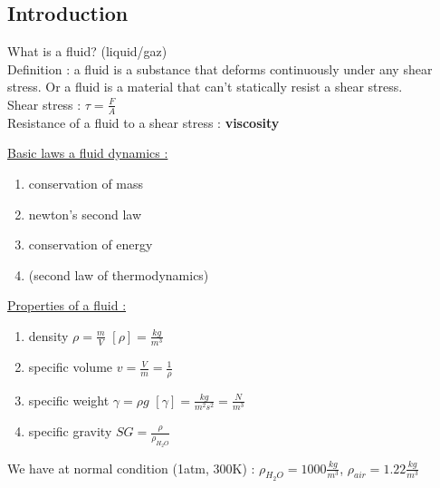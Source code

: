 \documentclass[../main.tex]{subfiles}
\begin{document}
\localtableofcontents
\subsection{Introduction}
\quad What is a fluid? (liquid/gaz)\\

Definition : a fluid is a substance that deforms continuously under any shear stress. Or a fluid is a material that can't statically resist a shear stress.\\

Shear stress : $\tau = \frac{F}{A}$\\
Resistance of a fluid to a shear stress : \textbf{viscosity}\\

\begin{minipage}{.5\textwidth}
\quad \underline{Basic laws a fluid dynamics :}\\
\begin{enumerate}
    \item conservation of mass\\
    \item newton's second law\\
    \item conservation of energy\\
    \item (second law of thermodynamics)\\
\end{enumerate}
\end{minipage}
\hfill
\begin{minipage}{.5\textwidth}
    \quad \underline{Properties of a fluid :}\\
\begin{enumerate}
    \item density $\rho = \frac{m}{V}$ $[\rho] = \frac{kg}{m^3}$\\
    \item specific volume $v = \frac{V}{m} = \frac{1}{\rho}$\\
    \item specific weight $\gamma = \rho g$ $[\gamma] = \frac{kg}{m^2s^2} = \frac{N}{m^3}$\\
    \item specific gravity $SG = \frac{\rho}{\rho_{H_2O}}$\\
\end{enumerate}
\end{minipage}

We have at normal condition (1atm, 300K) : $\rho_{H_2O} = 1000\frac{kg}{m^3}$, $\rho_{air} = 1.22 \frac{kg}{m^3}$\\
\end{document}
